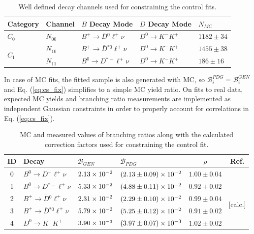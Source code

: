 \begin{table}[H]
	\centering
	\begin{tabular}{l|l|l|l|l}
		Category & Channel & $B$ Decay Mode & $D$ Decay Mode & $N_{MC}$ \\
		\toprule
		$C_0$ & $N_{00}$ & $B^+ \to \bar D {}^{0} \ell^+ \nu$ & $D^0 \to K^-K^+$ & $1182 \pm 34$\\
		\midrule
		\multirow{2}{*}{$C_1$} & $N_{10}$ & $B^+ \to \bar D {}^{*0} \ell^+ \nu$ & $D^0 \to K^-K^+$ & $1455\pm38$\\
		& $N_{11}$ & $B^0 \to D {}^{*-} \ell^+ \nu$ & $D^0 \to K^-K^+$ & $186\pm16$\\
		\bottomrule
	\end{tabular}
	\captionsetup{width=0.8\linewidth}
	\caption{Well defined decay channels used for constraining the control fits.}
	\label{tab:cs_constraint_table}
\end{table}

In case of MC fits, the fitted sample is also generated with MC, so $\mathcal{B}_{i}^{PDG} = \mathcal{B}_{i}^{GEN}$ and Eq. (\ref{eq:cs_fix}) simplifies to a simple MC yield ratio. On fits to real data, expected MC yields and branching ratio measurements are implemented as independent Gaussian constraints in order to properly account for correlations in Eq. (\ref{eq:cs_fix}).
\begin{table}[H]
	\centering
	\begin{tabular}{c|l|l|l|c|c}
		ID & Decay & $\mathcal{B}_{GEN}$ & $\mathcal{B}_{PDG}$ & $\rho$ & Ref. \\
		\toprule
		0 & $B^0 \to D {}^{-} \ell^+ \nu$ & $2.13\times 10^{-2}$ & $(2.13 \pm 0.09)\times 10^{-2}$ & $1.00 \pm 0.04$ & \multirow{2}{*}{\cite{Amhis:2016xyh}} \\ 
		1 & $B^0 \to D {}^{*-} \ell^+ \nu$ & $5.33\times 10^{-2}$ & $(4.88 \pm 0.11)\times 10^{-2}$ & $0.92 \pm 0.02$ & \\
		\cline{6-6}
		2 & $B^+ \to \bar D {}^{0} \ell^+ \nu$ & $2.31\times 10^{-2}$ & $(2.29 \pm 0.10)\times 10^{-2}$ &  $0.99 \pm 0.04$ & \multirow{2}{*}{[calc.]} \\ 
		3 & $B^+ \to \bar D {}^{*0} \ell^+ \nu$ & $5.79\times 10^{-2}$ & $(5.25 \pm 0.12)\times 10^{-2}$ &  $0.91 \pm 0.02$ & \\
		\cline{6-6}
		4 & $D^0 \to K^-K^+$ & $3.90\times 10^{-3}$ & $(3.97\pm0.07)\times 10^{-3}$ & $1.02 \pm 0.02$ & \cite{tanabashi2018review} \\
		\bottomrule
	\end{tabular}
	\captionsetup{width=0.8\linewidth}
	\caption{MC and measured values of branching ratios along with the calculated correction factors used for constraining the control fit.}
	\label{tab:cs_br_constraint_table}
\end{table}

